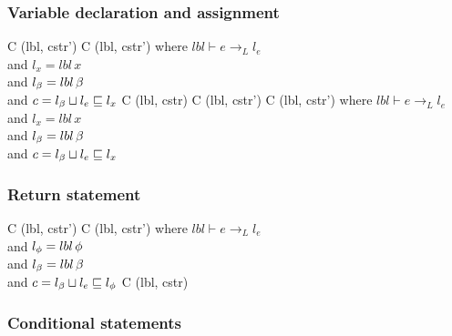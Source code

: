 \subsubsection{Variable declaration and assignment}

\begin{trules}
        { {C} {(lbl, cstr')} }
        { {C} {(lbl, cstr')} }
        {where $lbl \vdash e \rightarrow_L l_e$\\
          and $l_x = lbl \, x$\\
          and $l_\beta = lbl \, \beta$\\
          and $c = l_\beta \sqcup l_e \sqsubseteq l_x$}
        { {C} {(lbl, cstr)}}
        {}
        {}
        { {C} {(lbl, cstr')}}
        { {C} {(lbl, cstr')}}
        {where $lbl \vdash e \rightarrow_L l_e$\\
          and $l_x = lbl \, x$\\
          and $l_\beta = lbl \, \beta$\\
          and $c = l_\beta \sqcup l_e \sqsubseteq l_x$}
\end{trules}

\subsubsection{Return statement}

\begin{trules}
        { {C} {(lbl, cstr')} }
        { {C} {(lbl, cstr')} }
        {where $lbl \vdash e \rightarrow_L l_e$\\
          and $l_\phi = lbl \, \phi$\\
          and $l_\beta = lbl \, \beta$\\
          and $c = l_\beta \sqcup l_e \sqsubseteq l_\phi$}
        { {C} {(lbl, cstr)} }
        {}
        {}
        {}
\end{trules}

\subsubsection{Conditional statements}

